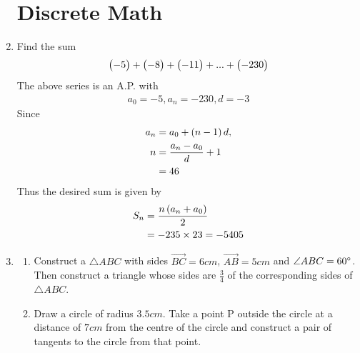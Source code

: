 \documentclass[journal,12pt,twocolumn]{IEEEtran}
\begin{document}
\begin{enumerate}[label=3.\arabic*]
\section{Discrete Math}
    \item Find the sum
	    \begin{align}
    \begin{pmatrix}-5\end{pmatrix} + \begin{pmatrix}-8\end{pmatrix} + \begin{pmatrix}-11\end{pmatrix} + ... + \begin{pmatrix}-230\end{pmatrix}
	    \end{align}
	    \solution The above series is an A.P. with 
	    \begin{align}
		    a_0 = -5, a_n = -230, d = -3
	    \end{align}
	    Since 
	    \begin{align}
		    a_n &= a_0 + \left(n-1\right)d, 
		    \\
		    n &= \frac{a_n - a_0}{d} + 1
		    \\
		     &= 46
	    \end{align}
	    Thus the desired sum is given by 
	    \begin{align}
		    S_n &=  \frac{n\left(a_n + a_0\right)}{2}  
		    \\
		    &=  -235 \times 23 = -5405
	    \end{align}
    
    \item 
    \begin{enumerate}
    \item Construct a $\triangle ABC$ with sides $\vec{BC}=6cm$, $\vec{AB} = 5cm$ and $\angle{ABC} = 60\degree$. Then construct a triangle whose sides are $\frac{3}{4}$ of the corresponding sides of $\triangle ABC$.\\
    
    \item Draw a circle of radius $3.5 cm$. Take a point P outside the circle at a distance of $7 cm$ from the centre of the circle and construct a pair of tangents to the circle from that point. \\
    \end{enumerate}
    

\end{enumerate}
\end{document}
